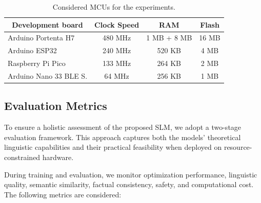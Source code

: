 \documentclass{ieeeaccess}
\begin{document}
\begin{table}[htpb]
\begin{center}
\caption{Considered MCUs for the experiments.}
\label{tab:microcontrollers}
\begin{tabular}{l c c c} 
\toprule
\multicolumn{1}{c}{\textbf{Development board}} &
\multicolumn{1}{c}{\textbf{Clock Speed}} &
\multicolumn{1}{c}{\textbf{RAM}} &
\multicolumn{1}{c}{\textbf{Flash}} \\
\midrule
Arduino Portenta H7           & 480 MHz               & 1 MB + 8 MB    & 16 MB    \\  
Arduino ESP32                & 240 MHz               & 520 KB         & 4 MB    \\ 
Raspberry Pi Pico             & 133 MHz               & 264 KB         & 2 MB    \\
Arduino Nano 33 BLE S.      & 64 MHz                & 256 KB         & 1 MB    \\ 
\bottomrule
\end{tabular}
\end{center}
\end{table}

\subsection{Evaluation Metrics}
\label{subsec:eval_metrics}

To ensure a holistic assessment of the proposed SLM, we adopt a two-stage evaluation framework. This approach captures both the models' theoretical linguistic capabilities and their practical feasibility when deployed on resource-constrained hardware.

During training and evaluation, we monitor optimization performance, linguistic quality, semantic similarity, factual consistency, safety, and computational cost. The following metrics are considered:
\end{document}
